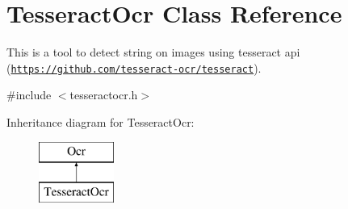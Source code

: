 \hypertarget{classTesseractOcr}{}\section{Tesseract\+Ocr Class Reference}
\label{classTesseractOcr}


This is a tool to detect string on images using tesseract api (\href{https://github.com/tesseract-ocr/tesseract}{\tt https\+://github.\+com/tesseract-\/ocr/tesseract}).  




{\ttfamily \#include $<$tesseractocr.\+h$>$}

Inheritance diagram for Tesseract\+Ocr\+:\begin{figure}[H]
\begin{center}
\leavevmode
\includegraphics[height=2.000000cm]{classTesseractOcr}
\end{center}
\end{figure}
